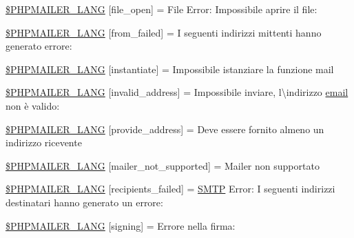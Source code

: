 \begin{DoxyCompactItemize}
\item 
\hyperlink{phpmailer_8lang-it_8php_a28d1a6517bf4c942a0ddd506188ad2e0}{\$\+P\+H\+P\+M\+A\+I\+L\+E\+R\+\_\+\+L\+A\+NG} \mbox{[}\textquotesingle{}file\+\_\+open\textquotesingle{}\mbox{]} = \textquotesingle{}File Error\+: Impossibile aprire il file\+: \textquotesingle{}
\item 
\hyperlink{phpmailer_8lang-it_8php_adf832ae12155a09be077c6d5e4fd7e22}{\$\+P\+H\+P\+M\+A\+I\+L\+E\+R\+\_\+\+L\+A\+NG} \mbox{[}\textquotesingle{}from\+\_\+failed\textquotesingle{}\mbox{]} = \textquotesingle{}I seguenti indirizzi mittenti hanno generato errore\+: \textquotesingle{}
\item 
\hyperlink{phpmailer_8lang-it_8php_ad58dde16780f4770ccf4dd282ea1f5ad}{\$\+P\+H\+P\+M\+A\+I\+L\+E\+R\+\_\+\+L\+A\+NG} \mbox{[}\textquotesingle{}instantiate\textquotesingle{}\mbox{]} = \textquotesingle{}Impossibile istanziare la funzione mail\textquotesingle{}
\item 
\hyperlink{phpmailer_8lang-it_8php_a42d61bcea4c79599ecb44fd062f54d47}{\$\+P\+H\+P\+M\+A\+I\+L\+E\+R\+\_\+\+L\+A\+NG} \mbox{[}\textquotesingle{}invalid\+\_\+address\textquotesingle{}\mbox{]} = \textquotesingle{}Impossibile inviare, l\textbackslash{}\textquotesingle{}indirizzo \hyperlink{actions_2account_8php_a011c66ae212438e0d7de7c0e40451bb3}{email} non è valido\+: \textquotesingle{}
\item 
\hyperlink{phpmailer_8lang-it_8php_a8b97897c2406b7392b056f375feeefbb}{\$\+P\+H\+P\+M\+A\+I\+L\+E\+R\+\_\+\+L\+A\+NG} \mbox{[}\textquotesingle{}provide\+\_\+address\textquotesingle{}\mbox{]} = \textquotesingle{}Deve essere fornito almeno un indirizzo ricevente\textquotesingle{}
\item 
\hyperlink{phpmailer_8lang-it_8php_aa2ebcb8833ee83a7ad67401c4bb3a6ad}{\$\+P\+H\+P\+M\+A\+I\+L\+E\+R\+\_\+\+L\+A\+NG} \mbox{[}\textquotesingle{}mailer\+\_\+not\+\_\+supported\textquotesingle{}\mbox{]} = \textquotesingle{}Mailer non supportato\textquotesingle{}
\item 
\hyperlink{phpmailer_8lang-it_8php_a7589d30bb9b368327c2df015f3e6bcba}{\$\+P\+H\+P\+M\+A\+I\+L\+E\+R\+\_\+\+L\+A\+NG} \mbox{[}\textquotesingle{}recipients\+\_\+failed\textquotesingle{}\mbox{]} = \textquotesingle{}\hyperlink{class_s_m_t_p}{S\+M\+TP} Error\+: I seguenti indirizzi destinatari hanno generato un errore\+: \textquotesingle{}
\item 
\hyperlink{phpmailer_8lang-it_8php_a68e437bdb9b968a5a67320f03d231565}{\$\+P\+H\+P\+M\+A\+I\+L\+E\+R\+\_\+\+L\+A\+NG} \mbox{[}\textquotesingle{}signing\textquotesingle{}\mbox{]} = \textquotesingle{}Errore nella firma\+: \textquotesingle{}

\end{DoxyCompactItemize}
